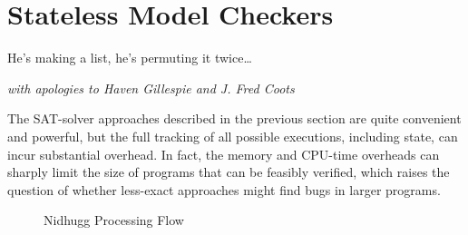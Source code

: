 
\section{Stateless Model Checkers}
\label{sec:formal:Stateless Model Checkers}
%
\epigraph{He's making a list, he's permuting it twice\dots}
	{\emph{with apologies to Haven Gillespie and J. Fred Coots}}

The SAT-solver approaches described in the previous section are quite
convenient and powerful, but the full tracking of all possible
executions, including state, can incur substantial overhead.
In fact, the memory and CPU-time overheads can sharply limit the size
of programs that can be feasibly verified, which raises the question
of whether less-exact approaches might find bugs in larger programs.

\begin{figure}
\centering
{}
\caption{Nidhugg Processing Flow}
\label{fig:formal:Nidhugg Processing Flow}
\end{figure}

